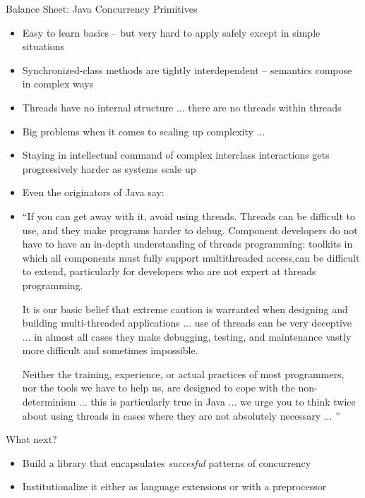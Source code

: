 \documentclass{concdistfoils}
\def\heading#1{\begin{cframed}[8.8in]{#1}\end{cframed}}
\begin{document}
\begin{slide}
\heading{Balance Sheet: Java Concurrency Primitives}
\vfill
\begin{itemize}
\item Easy to learn basics -- but very hard to apply safely except in 
simple situations

\vfill
  

\item Synchronized-class methods are tightly interdependent -- 
semantics compose in complex ways 


\vfill
  

\item Threads have no internal structure ... there are no threads within threads
  
\vfill

\item Big problems when it comes to scaling up complexity ...
\vfill

\item Staying in intellectual command of complex interclass interactions gets
progressively harder as systems scale up 
\end{itemize}
\vfill
\end{slide}

\begin{slide}
\begin{itemize}
\item Even the originators of Java say:
\vfill

\item[] 
 ``If you can get away with it, avoid using threads. Threads can be
   difficult to use, and they make programs harder to debug.
\vfill
 Component developers do not have to have an in-depth understanding
 of threads programming: toolkits in which all components must fully
 support multithreaded access,can be difficult to extend, particularly
 for developers who are not expert at threads programming.
\vfill

 It is our basic belief that extreme caution is warranted
when designing and building
 multi-threaded applications
... use of threads can be very deceptive ... 
 in almost all
cases they make debugging, testing, and maintenance
 vastly more difficult and sometimes impossible. 
\vfill
 
 Neither
the training, experience, or actual practices of most
programmers, 
 nor the tools we have to help us, are
designed to cope with the non-determinism ... 
 this is
particularly true in Java ... 
 we urge you to think twice
about using threads in cases where 
 they are not
absolutely necessary ... ''
\end{itemize}
\end{slide}

\begin{slide}
\heading{What next?}
\vfill
\begin{itemize}
\item Build a library that encapsulates \textit{succesful} patterns of concurrency
\item Institutionalize it either as language extensions or with a preprocessor
\end{itemize}
\vfill
\end{slide}
\end{document}
